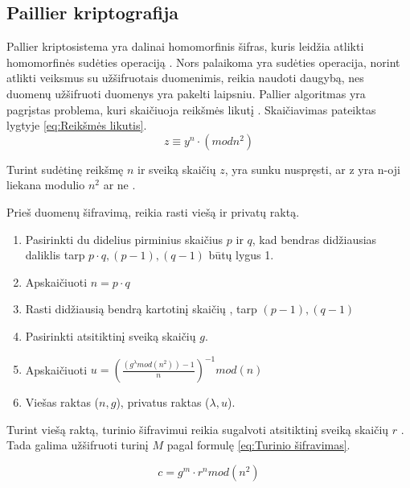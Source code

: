 \documentclass{VUMIFInfBakalaurinis}
\begin{document}
\subsection{Paillier kriptografija}
\par Pallier kriptosistema yra dalinai homomorfinis šifras, kuris leidžia atlikti homomorfinės sudėties operaciją \cite{17}. Nors palaikoma yra sudėties operacija, norint atlikti veiksmus su užšifruotais duomenimis, reikia naudoti daugybą, nes duomenų užšifruoti duomenys yra pakelti laipsniu. Pallier algoritmas yra pagrįstas problema, kuri skaičiuoja reikšmės likutį \cite{17}. Skaičiavimas pateiktas lygtyje \eqref{eq:Reikšmės likutis}.
\begin{equation}
    z \equiv y^{n} \cdot (mod n^{2})
    \label{eq:Reikšmės likutis}
\end{equation}
\par Turint sudėtinę reikšmę $n$ ir sveiką skaičių $z$, yra sunku nuspręsti, ar z yra n-oji liekana modulio $n^{2}$ ar ne \cite{17}.
\par Prieš duomenų šifravimą, reikia rasti viešą ir privatų raktą.

\begin{enumerate}
    \item Pasirinkti du didelius pirminius skaičius $p$ ir $q$, kad bendras didžiausias daliklis tarp $p \cdot q, (p - 1), (q - 1)$ būtų lygus 1.
    \item Apskaičiuoti $n = p \cdot q$
    \item Rasti didžiausią bendrą kartotinį skaičių \lambda, tarp $(p - 1), (q - 1)$
    \item Pasirinkti atsitiktinį sveiką skaičių $g$.
    \item Apskaičiuoti $u = (\frac{(g^{\lambda} mod (n^2)) - 1}{n})^{-1} mod (n)$
    \item Viešas raktas ($n, g$), privatus raktas ($\lambda, u$).
\end{enumerate}

\par Turint viešą raktą, turinio šifravimui reikia sugalvoti atsitiktinį sveiką skaičių $r$ \cite{17}. Tada galima užšifruoti turinį $M$ pagal formulę \eqref{eq:Turinio šifravimas}.

\begin{equation}
    c = g^{m} \cdot r^{n} mod(n^{2})
    \label{eq:Turinio šifravimas}
\end{equation}
\end{document}
